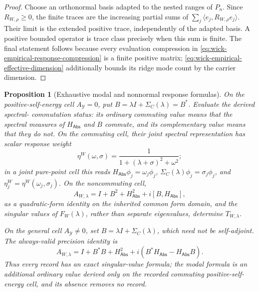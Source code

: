 \documentclass[11pt]{article}
\numberwithin{section}{part}
\theoremstyle{plain}
\newtheorem{proposition}[proposition]{Proposition}
\theoremstyle{definition}
\theoremstyle{remark}
\newcommand{\Abs}{\mathsf{Abs}}
\begin{document}
\begin{proof}
Choose an orthonormal basis adapted to the nested ranges of \(P_n\).  Since
\(R_{W,\rho}\ge0\), the finite traces are the increasing partial sums of
\(\sum_j\langle e_j,R_{W,\rho}e_j\rangle\).  Their limit is the extended
positive trace, independently of the adapted basis.  A positive bounded
operator is trace class precisely when this sum is finite.  The final
statement follows because every evaluation compression in
\eqref{eq:wick-empirical-response-compression} is a finite positive matrix;
\eqref{eq:wick-empirical-effective-dimension} additionally bounds its ridge
mode count by the carrier dimension.
\end{proof}

\begin{proposition}[Exhaustive modal and nonnormal response formulas]
\label{prop:wick-response-formulas}
On the positive-self-energy cell \(A_{\mathcal Y}=0\), put
\(B=\lambda I+\Sigma_C(\lambda)=B^*\).  Evaluate the derived spectral-
commutation status: its ordinary commuting value means that the spectral
measures of \(H_{\Abs}\) and \(B\) commute, and its complementary value means
that they do not.  On the commuting cell, their joint spectral representation
has scalar response
weight
\begin{equation}
 \label{eq:wick-modal-weights}
 \eta^W(\omega,\sigma)
 =\frac{1}{1+(\lambda+\sigma)^2+\omega^2};
\end{equation}
in a joint pure-point cell this reads
\(H_{\Abs}\phi_j=\omega_j\phi_j\),
\(\Sigma_C(\lambda)\phi_j=\sigma_j\phi_j\), and
\(\eta_j^W=\eta^W(\omega_j,\sigma_j)\).  On the noncommuting cell,
\begin{equation}
 \label{eq:wick-nonnormal-precision}
 A_{W,\lambda}
 =I+B^2+H_{\Abs}^2+i[B,H_{\Abs}],
\end{equation}
as a quadratic-form identity on the inherited common form domain, and the
singular values of \(F_W(\lambda)\), rather than separate eigenvalues,
determine \(T_{W,\lambda}\).

On the general cell \(A_{\mathcal Y}\ne0\), set
\(B=\lambda I+\Sigma_C(\lambda)\), which need not be self-adjoint.  The
always-valid precision identity is
\begin{equation}
 \label{eq:wick-general-nonnormal-precision}
 A_{W,\lambda}
 =I+B^*B+H_{\Abs}^2+i(B^*H_{\Abs}-H_{\Abs}B).
\end{equation}
Thus every record has an exact singular-value formula; the modal formula is
an additional ordinary value derived only on the recorded commuting
positive-self-energy cell, and its absence removes no record.
\end{proposition}
\end{document}
